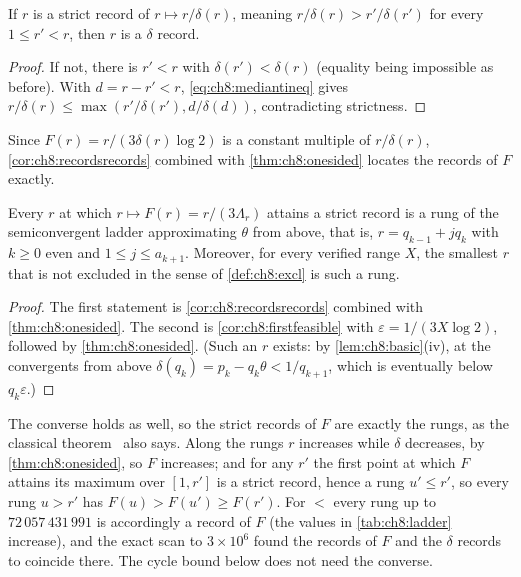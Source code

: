 \begin{corollary}\label{cor:ch8:recordsrecords}
If $r$ is a strict record of $r\mapsto r/\delta(r)$, meaning
$r/\delta(r)>r'/\delta(r')$ for every $1\leq r'<r$, then $r$ is a $\delta$
record.
\end{corollary}

\begin{proof}
If not, there is $r'<r$ with $\delta(r')<\delta(r)$ (equality being impossible
as before). With $d=r-r'<r$, \eqref{eq:ch8:mediantineq} gives
$r/\delta(r)\leq\max(r'/\delta(r'),d/\delta(d))$, contradicting strictness.
\end{proof}

Since $F(r)=r/(3\delta(r)\log2)$ is a constant multiple of $r/\delta(r)$,
\cref{cor:ch8:recordsrecords} combined with \cref{thm:ch8:onesided} locates
the records of $F$ exactly.

\begin{proposition}\label{prop:records}
Every $r$ at which $r\mapsto F(r)=r/(3\Lambda_r)$ attains a strict record is a
rung of the semiconvergent ladder approximating $\theta$ from above, that is,
$r=q_{k-1}+jq_k$ with $k\geq0$ even and $1\leq j\leq a_{k+1}$. Moreover, for
every verified range $X$, the smallest $r$ that is not excluded in the sense
of \cref{def:ch8:excl} is such a rung.
\end{proposition}

\begin{proof}
The first statement is \cref{cor:ch8:recordsrecords} combined with
\cref{thm:ch8:onesided}. The second is \cref{cor:ch8:firstfeasible} with
$\varepsilon=1/(3X\log2)$, followed by \cref{thm:ch8:onesided}. (Such an $r$
exists: by \cref{lem:ch8:basic}(iv), at the convergents from above
$\delta(q_k)=p_k-q_k\theta<1/q_{k+1}$, which is eventually below
$q_k\varepsilon$.)
\end{proof}

The converse holds as well, so the strict records of $F$ are exactly the rungs, as the classical theorem~\cite[Theorem~4.5(ii)]{hancl2019} also says. Along the rungs $r$ increases while $\delta$ decreases, by \cref{thm:ch8:onesided}, so $F$ increases; and for any $r'$ the first point at which $F$ attains its maximum over $[1,r']$ is a strict record, hence a rung $u'\leq r'$, so every rung $u>r'$ has $F(u)>F(u')\geq F(r')$.
For $\lt$ every rung
up to $72\,057\,431\,991$ is accordingly a record of $F$ (the values in
\cref{tab:ch8:ladder} increase), and the exact scan to $3\times10^6$ found
the records of $F$ and the $\delta$ records to coincide there. The cycle bound
below does not need the converse.


